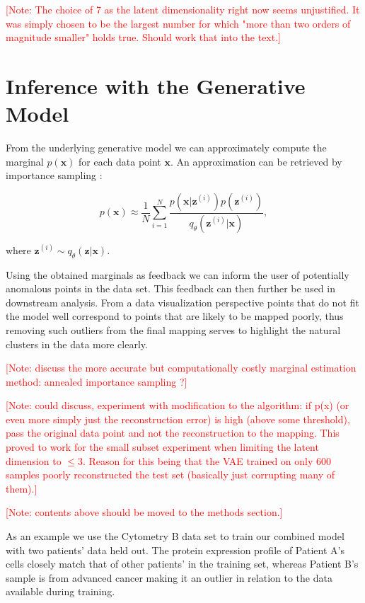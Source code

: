 \textcolor{red}{[Note: The choice of 7 as the latent dimensionality right now seems unjustified. It was simply chosen to be the largest number for which "more than two orders of magnitude smaller" holds true. Should work that into the text.]}

\section{Inference with the Generative Model}

From the underlying generative model we can approximately compute the marginal $p(\mathbf{x})$ for each data point $\mathbf{x}$. An approximation can be retrieved by importance sampling \citep{stochastic_backpropagation}:

$$p(\mathbf{x}) \approx \frac{1}{N} \sum_{i=1}^{N} \frac{p(\mathbf{x} \vert \mathbf{z}^{(i)}) p(\mathbf{z}^{(i)})}{q_{\theta}(\mathbf{z}^{(i)} \vert \mathbf{x})},$$

where $\mathbf{z}^{(i)} \sim q_{\theta}(\mathbf{z} \vert \mathbf{x})$.

Using the obtained marginals as feedback we can inform the user of potentially anomalous points in the data set. This feedback can then further be used in downstream analysis. From a data visualization perspective points that do not fit the model well correspond to points that are likely to be mapped poorly, thus removing such outliers from the final mapping serves to highlight the natural clusters in the data more clearly.

\textcolor{red}{[Note: discuss the more accurate but computationally costly marginal estimation method: annealed importance sampling \citep{ais, ais_vae}?]}

\textcolor{red}{[Note: could discuss, experiment with modification to the algorithm: if p(x) (or even more simply just the reconstruction error) is high (above some threshold), pass the original data point and not the reconstruction to the mapping. This proved to work for the small subset experiment when limiting the latent dimension to $\leq 3$. Reason for this being that the VAE trained on only 600 samples poorly reconstructed the test set (basically just corrupting many of them).]}

\textcolor{red}{[Note: contents above should be moved to the methods section.]}

As an example we use the Cytometry B data set to train our combined model with two patients' data held out. The protein expression profile of Patient A's cells closely match that of other patients' in the training set, whereas Patient B's sample is from advanced cancer making it an outlier in relation to the data available during training.

